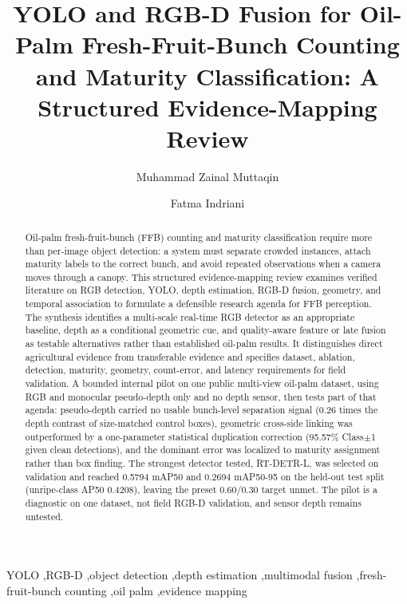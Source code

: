 \documentclass[review]{elsarticle}
\begin{document}
\begin{frontmatter}
\title{YOLO and RGB-D Fusion for Oil-Palm Fresh-Fruit-Bunch Counting and Maturity Classification: A Structured Evidence-Mapping Review}
\author[a]{Muhammad Zainal Muttaqin}
\author[a]{Fatma Indriani}
\begin{abstract}
Oil-palm fresh-fruit-bunch (FFB) counting and maturity classification require
more than per-image object detection: a system must separate crowded instances,
attach maturity labels to the correct bunch, and avoid repeated observations
when a camera moves through a canopy. This structured evidence-mapping review
examines verified literature on RGB detection, YOLO, depth estimation, RGB-D
fusion, geometry, and temporal association to formulate a defensible research
agenda for FFB perception. The synthesis identifies a multi-scale real-time
RGB detector as an appropriate baseline, depth as a conditional geometric cue,
and quality-aware feature or late fusion as testable alternatives rather than
established oil-palm results. It distinguishes direct agricultural evidence
from transferable evidence and specifies dataset, ablation, detection, maturity,
geometry, count-error, and latency requirements for field validation.
A bounded internal pilot on one public multi-view oil-palm dataset, using RGB
and monocular pseudo-depth only and no depth sensor, then tests part of that
agenda: pseudo-depth carried no usable bunch-level separation signal (0.26 times
the depth contrast of size-matched control boxes), geometric cross-side linking
was outperformed by a one-parameter statistical duplication correction (95.57\%
Class$\pm$1 given clean detections), and the dominant error was localized to
maturity assignment rather than box finding. The strongest detector tested,
RT-DETR-L, was selected on validation and reached 0.5794 mAP50 and 0.2694
mAP50-95 on the held-out test split (unripe-class AP50 0.4208), leaving the
preset 0.60/0.30 target unmet. The pilot is a diagnostic on one dataset, not
field RGB-D validation, and sensor depth remains untested.
\end{abstract}
\begin{keyword}YOLO \sep RGB-D \sep object detection \sep depth estimation \sep multimodal fusion \sep fresh-fruit-bunch counting \sep oil palm \sep evidence mapping\end{keyword}
\end{frontmatter}



\end{document}
